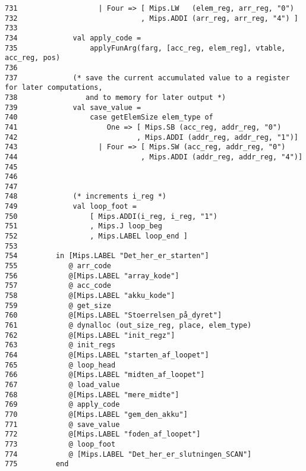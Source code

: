 \documentclass[paper=a4, fontsize=11pt]{scrartcl} %
\numberwithin{equation}{section} %
\numberwithin{figure}{section} %
\numberwithin{table}{section} %
\begin{document}
\begin{lstlisting}
731	                  | Four => [ Mips.LW   (elem_reg, arr_reg, "0") 
732	                            , Mips.ADDI (arr_reg, arr_reg, "4") ] 
733	                
734	            val apply_code = 
735	                applyFunArg(farg, [acc_reg, elem_reg], vtable, acc_reg, pos) 
736	  
737	            (* save the current accumulated value to a register for later computations, 
738	               and to memory for later output *) 
739	            val save_value = 
740	                case getElemSize elem_type of 
741	                    One => [ Mips.SB (acc_reg, addr_reg, "0") 
742	                           , Mips.ADDI (addr_reg, addr_reg, "1")] 
743	                  | Four => [ Mips.SW (acc_reg, addr_reg, "0")  
744	                            , Mips.ADDI (addr_reg, addr_reg, "4")] 
745	  
746	  
747	  
748	            (* increments i_reg *) 
749	            val loop_foot = 
750	                [ Mips.ADDI(i_reg, i_reg, "1") 
751	                , Mips.J loop_beg 
752	                , Mips.LABEL loop_end ] 
753	            
754	        in [Mips.LABEL "Det_her_er_starten"]  
755	           @ arr_code 
756	           @[Mips.LABEL "array_kode"]  
757	           @ acc_code 
758	           @[Mips.LABEL "akku_kode"]  
759	           @ get_size 
760	           @[Mips.LABEL "Stoerrelsen_på_dyret"]  
761	           @ dynalloc (out_size_reg, place, elem_type) 
762	           @[Mips.LABEL "init_regz"]  
763	           @ init_regs 
764	           @[Mips.LABEL "starten_af_loopet"]  
765	           @ loop_head 
766	           @[Mips.LABEL "midten_af_loopet"]  
767	           @ load_value 
768	           @[Mips.LABEL "mere_midte"]  
769	           @ apply_code 
770	           @[Mips.LABEL "gem_den_akku"]  
771	           @ save_value 
772	           @[Mips.LABEL "foden_af_loopet"]  
773	           @ loop_foot 
774	           @ [Mips.LABEL "Det_her_er_slutningen_SCAN"] 
775	        end 


\end{lstlisting}
\end{document}
